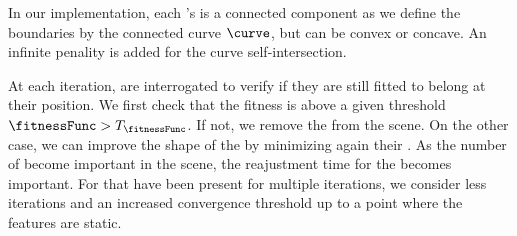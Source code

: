 In our implementation, each 's  is a connected component as we define the boundaries by the connected curve $\curve$, but can be convex or concave. An infinite penality is added for the curve self-intersection.



At each iteration,  are interrogated to verify if they are still fitted to belong at their position. We first check that the fitness is above a given threshold  $\fitnessFunc > T_{\fitnessFunc}$. If not, we remove the  from the scene. On the other case, we can improve the shape of the  by minimizing again their . As the number of  become important in the scene, the reajustment time for the  becomes important. For  that have been present for multiple iterations, we consider less iterations and an increased convergence threshold up to a point where the features are static.



